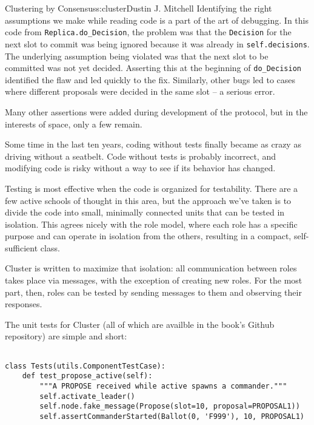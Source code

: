 \begin{aosachapter}{Clustering by Consensus}{s:cluster}{Dustin J. Mitchell}
Identifying the right assumptions we make while reading code is a part
of the art of debugging. In this code from
\texttt{Replica.do\_Decision}, the problem was that the
\texttt{Decision} for the next slot to commit was being ignored because
it was already in \texttt{self.decisions}. The underlying assumption
being violated was that the next slot to be committed was not yet
decided. Asserting this at the beginning of \texttt{do\_Decision}
identified the flaw and led quickly to the fix. Similarly, other bugs
led to cases where different proposals were decided in the same slot --
a serious error.

Many other assertions were added during development of the protocol, but
in the interests of space, only a few remain.

\label{testing}

Some time in the last ten years, coding without tests finally became as
crazy as driving without a seatbelt. Code without tests is probably
incorrect, and modifying code is risky without a way to see if its
behavior has changed.

Testing is most effective when the code is organized for testability.
There are a few active schools of thought in this area, but the approach
we've taken is to divide the code into small, minimally connected units
that can be tested in isolation. This agrees nicely with the role model,
where each role has a specific purpose and can operate in isolation from
the others, resulting in a compact, self-sufficient class.

Cluster is written to maximize that isolation: all communication between
roles takes place via messages, with the exception of creating new
roles. For the most part, then, roles can be tested by sending messages
to them and observing their responses.

\label{unit-testing}

The unit tests for Cluster (all of which are availble in the book's
Github repository) are simple and short:

\begin{verbatim}

class Tests(utils.ComponentTestCase):
    def test_propose_active(self):
        """A PROPOSE received while active spawns a commander."""
        self.activate_leader()
        self.node.fake_message(Propose(slot=10, proposal=PROPOSAL1))
        self.assertCommanderStarted(Ballot(0, 'F999'), 10, PROPOSAL1)
    
\end{verbatim}


\end{aosachapter}
